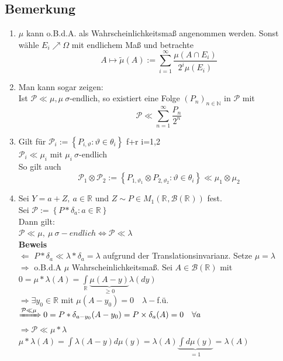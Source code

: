 \documentclass[german,10pt,oneside, fleqn, a4paper]{article}
\newcommand {\R}	{\mathbb{R}}
\newcommand {\N}	{\mathbb{N}}
\newcommand{\Ra}	{\Rightarrow}
\newcommand{\La}	{\Leftarrow}
\newcommand{\LRa}{\Leftrightarrow}
\newcommand{\sm}[2][\infty]{\sum\limits_{#2}^{#1}}
\newcommand{\brc}[1]{\left(#1\right)}
\newcommand{\brac}[1]{\left\lbrace #1\right\rbrace}
\newcommand{\folge}[3][\N]{\left(#2_#3\right)_{#3\in #1}}
\newcommand{\mc}[1]{\mathcal{#1}}
\newcommand{\beweis}{\textbf{Beweis}\\}
\newcommand{\1}[1]{1_{#1}}
\newcommand{\2}[1]{\1{\brac{#1}}}
\newcommand{\rbor}[1][d]{\brc{\R^{#1},\mc{B}\brc{\R^{#1}}}}
\newcommand{\intr}{\int\limits_\R}
\newcommand{\p}{\mc{P}}
\begin{document}
\subsection{Bemerkung}
\label{9.7}
\begin{enumerate}[label=(\roman*)]
\item $\mu$ kann o.B.d.A. als Wahrscheinlichkeitsmaß angenommen werden. Sonst wähle $E_i\nearrow\Omega$ mit endlichem Maß und betrachte\[
A\mapsto\tilde{\mu}(A):=\sm{i=1}\dfrac{\mu(A\cap E_i)}{2^i\mu(E_i)}\]
\item Man kann sogar zeigen: \\
Ist $\p\ll\mu, \mu\ \sigma$-endlich, so existiert eine Folge $\folge{P}{n}$ in $\p$ mit \[
\p\ll\sm{n=1}\dfrac{P_n}{2^n}\]
\item Gilt für $\p_i:=\brac{P_{i,\vartheta}:\vartheta\in\theta_i}$ f+r i=1,2 \\
$\p_i\ll\mu_i$ mit $\mu_i\ \sigma$-endlich\\
So gilt auch\[
\p_1\otimes\p_2:=\brac{P_{1,\vartheta_1}\otimes P_{2,\vartheta_2}:\vartheta\in\theta_i}\ll\mu_1\otimes\mu_2\]
\item Sei $Y=a+Z,\ a\in\R$ und $Z\sim P\in M_1\rbor[]$ fest.\\
Sei $\p:=\brac{P*\delta_a:a\in\R}$\\
Dann gilt:\\
$\p\ll\mu,\ \mu\ \sigma-endlich\LRa\p\ll\lambda$\\
\beweis
\glqq $\La$ \grqq $P*\delta_a\ll\lambda*\delta_a=\lambda$ aufgrund der Translationsinvarianz. Setze $\mu=\lambda$\\
\glqq $\Ra$ \grqq o.B.d.A $\mu$ Wahrscheinlichkeitsmaß. Sei $A\in\mc{B}(\R)$ mit\\
$0=\mu*\lambda(A)=\intr \underbrace{\mu(A-y)}_{\geq 0}\lambda(dy)$\\
$\Ra \exists y_0\in\R$ mit $\mu(A-y_0)=0\quad \lambda-$f.ü.\\
$\xRightarrow{\p\ll\mu} 0=P*\delta_{a-y_0}(A-y_0)=P\times\delta_a(A)=0\quad \forall a$\\
$\Ra \p\ll\mu*\lambda$\\
$\mu*\lambda(A)=\int \lambda(A-y)d\mu(y)=\lambda(A)\underbrace{\int d\mu(y)}_{=1}=\lambda(A)$
\end{enumerate}
\end{document}
